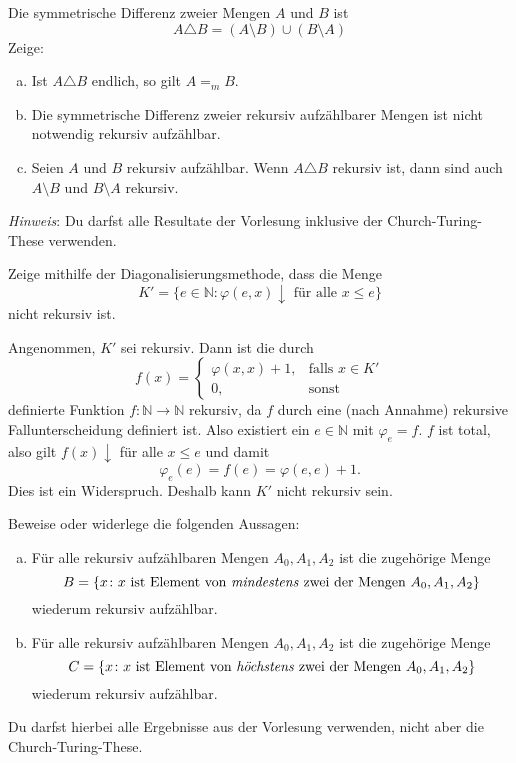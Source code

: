 \documentclass[german,headsepline]{scrartcl}
\theoremstyle{definition}
\begin{document}
	\begin{question}
		Die symmetrische Differenz zweier Mengen $A$ und $B$ ist
		\[A\triangle B=(A\setminus B)\cup(B\setminus A)\]
		Zeige:
		\begin{enumerate}[(a)]
			\item Ist $A\triangle B$ endlich, so gilt $A=_mB$.
			\item Die symmetrische Differenz zweier rekursiv aufzählbarer Mengen ist nicht notwendig rekursiv aufzählbar.
			\item Seien $A$ und $B$ rekursiv aufzählbar.
				Wenn $A\triangle B$ rekursiv ist, dann sind auch $A\setminus B$ und $B\setminus A$ rekursiv.
		\end{enumerate}
		\textit{Hinweis}: Du darfst alle Resultate der Vorlesung inklusive der Church-Turing-These verwenden.
	\end{question}
	
	\begin{question}
		Zeige mithilfe der Diagonalisierungsmethode, dass die Menge
		\[K'=\{e\in\mathbb{N}\colon\varphi(e,x)\downarrow\text{ für alle }x\leq e\}\]
		nicht rekursiv ist.
	\end{question}
	\begin{solution}
		Angenommen, $K'$ sei rekursiv. Dann ist die durch
		\[f(x)=\begin{cases}
			\varphi(x,x)+1, &\text{falls }x\in K' \\
			0, &\text{sonst}
		\end{cases}\]
		definierte Funktion $f:\mathbb{N}\to\mathbb{N}$ rekursiv,
		da $f$ durch eine (nach Annahme) rekursive Fallunterscheidung definiert ist.
		Also existiert ein $e\in\mathbb{N}$ mit $\varphi_e=f$.
		$f$ ist total, also gilt $f(x)\downarrow$ für alle $x\leq e$ und damit
		\[\varphi_e(e)=f(e)=\varphi(e,e)+1.\]
		Dies ist ein Widerspruch. Deshalb kann $K'$ nicht rekursiv sein.
	\end{solution}
	
	\begin{question}[subtitle={Klausur 2015}]
		Beweise oder widerlege die folgenden Aussagen:
		\begin{enumerate}[(a)]
			\item Für alle rekursiv aufzählbaren Mengen $A_0,A_1,A_2$ ist die zugehörige Menge
				\[B=\{x\colon x\text{ ist Element von \emph{mindestens} zwei der Mengen }A_0,A_1,A_2\}\]
				wiederum rekursiv aufzählbar.
			\item Für alle rekursiv aufzählbaren Mengen $A_0,A_1,A_2$ ist die zugehörige Menge
				\[C=\{x\colon x\text{ ist Element von \emph{höchstens} zwei der Mengen }A_0,A_1,A_2\}\]
				wiederum rekursiv aufzählbar.
		\end{enumerate}
		Du darfst hierbei alle Ergebnisse aus der Vorlesung verwenden, nicht aber die Church-Turing-These.
	\end{question}
	
\end{document}
